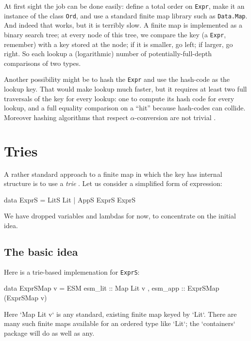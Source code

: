 \documentclass[format=sigplan]{acmart}
\theoremstyle{theorem}
\theoremstyle{definition}
\theoremstyle{remark}
\begin{document}
At first sight the job can be done easily: define a total order on
\lstinline{Expr}, make it an instance of the class \lstinline{Ord},
and use a standard finite map library such as \lstinline{Data.Map}.
And indeed that works, but it is terribly slow.  A finite map is
implemented as a binary search tree; at every node of this tree, we compare the key (a \lstinline{Expr}, remember) with
a key stored at the node; if it is smaller, go left; if larger, go right. So each lookup
a (logarithmic) number of potentially-full-depth comparisons of two types.

Another possibility might be to hash the \lstinline{Expr} and use the
hash-code as the lookup key.  That would make lookup much faster, but
it requires at least two full traversals of the key for every lookup:
one to compute its hash code for every lookup, and a full equality
comparison on a ``hit'' because hash-codes can collide.  Moreover
hashing algorithms that respect $\alpha$-conversion are not trivial
\cite{alpha-hashing}.

\section{Tries}

A rather standard approach to a finite map in which the key has internal structure
is to use a \emph{trie} \cite{trie}.  Let us consider a simplified
form of expression:
\begin{code}
  data ExprS = LitS Lit | AppS ExprS ExprS
\end{code}
We have dropped variables and lambdas for now, to concentrate on the initial idea.

\subsection{The basic idea} \label{sec:alter}

Here is a trie-based implemenation for \lstinline{ExprS}:
\begin{code}
  data ExprSMap v = ESM { esm_lit :: Map Lit v
                        , esm_app :: ExprSMap (ExprSMap v) }
\end{code}
Here `Map Lit v` is any standard, existing finite map keyed by `Lit`.
There are many such finite maps available for an ordered type like `Lit`;
the `containers` package will do as well as any.
\end{document}
